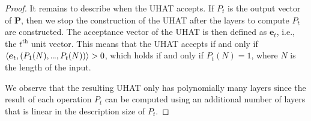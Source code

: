\documentclass{article} %
\newtheorem{lemma}[theorem]{Lemma}
\newcommand{\score}{\mathrm{S}}
\newcommand{\bnfdef}{\coloneqq}
\newcommand{\brasp}{\boldsymbol{P}}
\newcommand{\mydots}{%
  \ifmmode
    \mathord{.}\mkern-1mu\mathord{.}\mkern-1mu\mathord{.}%
  \else
    .\kern-0.1em.\kern-0.1em.%
  \fi
}
\renewcommand{\dots}{\mydots}%
\begin{document}
\begin{proof}
It remains to describe when the UHAT accepts.
If $P_t$ is the output vector of $\brasp$,
then we stop the construction of the UHAT after the layers to compute $P_t$ are constructed.
The acceptance vector of the UHAT is then defined as $\boldsymbol{e}_t$, i.e., the $t^{\text{th}}$ unit vector.
This means that the UHAT accepts if and only if $\langle \boldsymbol{e}_t,(P_1(N),\dots,P_t(N)) \rangle > 0$,
which holds if and only if $P_t(N) = 1$, where $N$ is the length of the input.

We observe that the resulting UHAT only has polynomially many layers
since the result of each operation $P_t$ can be computed using an additional number of layers
that is linear in the description size of $P_t$.
\end{proof}

\end{document}
